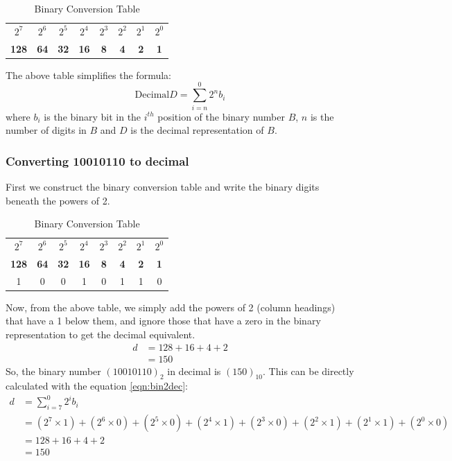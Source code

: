 \begin{table}[H]
	\centering
	\begin{tabular}{cccccccc}
		\toprule
		$2^7$ &$2^6$ &$2^5$ &$2^4$ &$2^3$ &$2^2$ &$2^1$ &$2^0$ \\
		\textbf{128} &\textbf{64} &\textbf{32} &\textbf{16} &\textbf{8} &\textbf{4} &\textbf{2} &\textbf{1} \\
		\bottomrule
	\end{tabular}
	\vspace{-5pt}
	\caption{Binary Conversion Table}
\end{table}
\vspace{-10pt}

\noindent
The above table simplifies the formula: 
\begin{equation}
	\text{Decimal} D = \sum_{i=n}^{0} 2^n b_i 
	\label{eqn:bin2dec}
\end{equation}
\noindent where $b_i$ is the binary bit in the $i^{th}$ position of the binary number $B$, $n$ is the number of digits in $B$ and $D$ is the decimal representation of $B$. 

\subsubsection{Converting 10010110 to decimal}
First we construct the binary conversion table and write the binary digits beneath the powers of 2. 

\begin{table}[H]
	\centering
	\begin{tabular}{cccccccc}
		\toprule
		$2^7$ &$2^6$ &$2^5$ &$2^4$ &$2^3$ &$2^2$ &$2^1$ &$2^0$ \\
		\textbf{128} &\textbf{64} &\textbf{32} &\textbf{16} &\textbf{8} &\textbf{4} &\textbf{2} &\textbf{1} \\
		\midrule
		1 &0 &0 &1 &0 &1 &1 &0 \\
		\bottomrule
	\end{tabular}
	\vspace{-5pt}
	\caption{Binary Conversion Table}
\end{table}
\vspace{-10pt}

\noindent
Now, from the above table, we simply add the powers of 2 (column headings) that have a 1 below them, and ignore those that have a zero in the binary representation to get the decimal equivalent.
\begin{align*}
	d &= 128 + 16 + 4 + 2\\
	  &= 150
\end{align*}
So, the binary number $(10010110)_2$ in decimal is $(150)_{10}$. This can be directly calculated with the equation \ref{eqn:bin2dec}: 
\begin{align*}
	d &= \sum_{i=7}^{0} 2^i b_i \\
	&= (2^7\times1) + (2^6\times0) + (2^5\times0) + (2^4\times1) + (2^3\times0) + (2^2\times1) +( 2^1\times1) + (2^0\times0) \\
	&= 128 + 16 + 4 + 2\\
	&= 150
\end{align*}

